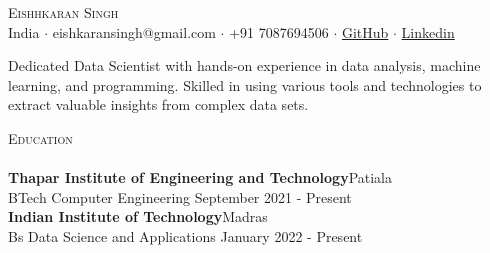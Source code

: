 \documentclass[a4paper]{article}
\newcommand{\lineunder} {
    \vspace*{-8pt} \\
    \hspace*{-18pt} \hrulefill \\
}
\newcommand{\header} [1] {
    {\hspace*{-18pt}\vspace*{6pt} \textsc{#1}}
    \vspace*{-6pt} \lineunder
}
\begin{document}
\vspace*{-40pt}

    

\vspace*{-9pt}
\begin{center}
	{\Huge \scshape {Eishhkaran Singh}}\\
	\vspace{2mm}
	India $\cdot$ eishkaransingh@gmail.com $\cdot$ +91 7087694506 $\cdot$ \href{https://github.com/EISHKARAN}{GitHub} $\cdot$ \href{https://www.linkedin.com/in/eishkaran-singh/}{Linkedin} \\
\end{center}

\begin{center}
Dedicated Data Scientist with hands-on experience in data analysis, machine learning, and programming. Skilled in using various tools and technologies to extract valuable insights from complex data sets.\\
\end{center}
\vspace{0.25mm}
\header{Education}
\vspace{0mm}
\textbf{Thapar Institute of Engineering and Technology}\hfill Patiala\\
BTech Computer  Engineering \hfill September 2021 - Present\\
\vspace{0.5mm}
\textbf{Indian Institute of Technology}\hfill Madras\\
Bs Data Science and Applications \hfill January 2022 - Present\\
\vspace{1mm}

 

\end{document}
